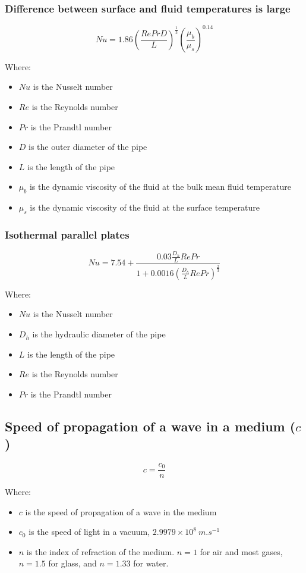 \documentclass[11pt]{article}
\begin{document}
\subsubsection{Difference between surface and fluid temperatures is large}
\label{sec:orge48d27b}
\[Nu = 1.86 \left(\frac{Re Pr D}{L} \right)^{\frac{1}{3}} \left(\frac{\mu_b}{\mu_s} \right)^{0.14}\]

Where:
\begin{itemize}
\item \(Nu\) is the Nusselt number
\item \(Re\) is the Reynolds number
\item \(Pr\) is the Prandtl number
\item \(D\) is the outer diameter of the pipe
\item \(L\) is the length of the pipe
\item \(\mu_b\) is the dynamic viscosity of the fluid at the bulk mean fluid temperature
\item \(\mu_s\) is the dynamic viscosity of the fluid at the surface temperature
\end{itemize}

 \newpage
\subsubsection{Isothermal parallel plates}
\label{sec:orgb1d0db4}
\[Nu = 7.54 + \frac{0.03 \frac{D_h}{L} Re Pr}{1 + 0.0016 \left(\frac{D_h}{L} Re Pr \right)^{\frac{2}{3}}}\]

Where:
\begin{itemize}
\item \(Nu\) is the Nusselt number
\item \(D_h\) is the hydraulic diameter of the pipe
\item \(L\) is the length of the pipe
\item \(Re\) is the Reynolds number
\item \(Pr\) is the Prandtl number
\end{itemize}
\subsection{Speed of propagation of a wave in a medium (\(c\))}
\label{sec:orgeb8f221}
\[c = \frac{c_0}{n}\]

Where:
\begin{itemize}
\item \(c\) is the speed of propagation of a wave in the medium
\item \(c_0\) is the speed of light in a vacuum, \(2.9979 \times 10^8 \ \unit{m.s^{-1}}\)
\item \(n\) is the index of refraction of the medium. \(n = 1\) for air and most gases, \(n = 1.5\) for glass, and \(n = 1.33\) for water.
\end{itemize}
\end{document}
